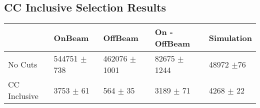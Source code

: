 \subsection{CC Inclusive Selection Results}
\begin{table}[H]
 \centering
 \begin{tabular}{| l | l | l | l | l |}
  \hline
   & OnBeam & OffBeam & On - OffBeam & Simulation \\ [0.1ex] \hline
No Cuts & 544751 $\pm$ 738 & 462076 $\pm$ 1001 & 82675 $\pm$ 1244 & 48972 $\pm$76 \\ 
CC Inclusive & 3753 $\pm$ 61 & 564 $\pm$ 35 & 3189 $\pm$ 71 & 4268 $\pm$ 22  \\ \hline

\end{tabular}
 \end{table}


